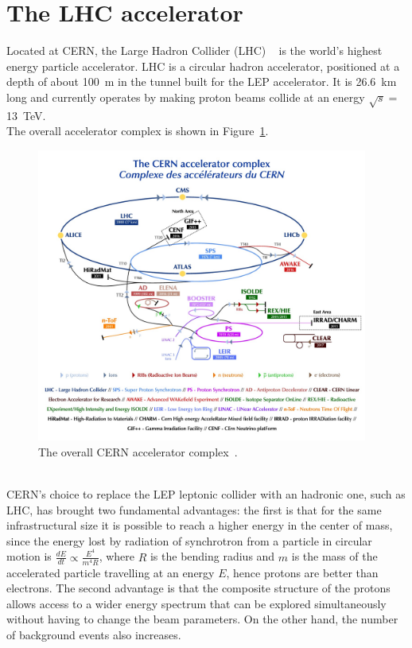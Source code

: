 \section{The LHC accelerator}
Located at CERN, the Large Hadron Collider (LHC) ~\cite{CERN_acc} is the world’s highest energy particle accelerator.
LHC is a circular hadron accelerator, positioned at a depth of about 100~m in the tunnel built for the LEP accelerator.
It is 26.6~km long and currently operates by making proton beams collide at an energy $ \sqrt {s} = $ 13~TeV. \\
The overall accelerator complex is shown in Figure~\ref{fig:CERN_complex}.
\begin{figure}[!h]
	\centering
	\includegraphics[width=0.97\textwidth]{Chapters/CH2/figures/CERN_complex}
	\caption{The overall CERN accelerator complex~\cite{CERN_complex}.}
	\label{fig:CERN_complex}
\end{figure}
\\CERN's choice to replace the LEP leptonic collider with an hadronic one, such as LHC, has brought two fundamental advantages: the first is that for the same infrastructural size it is possible to reach a higher energy in the center of mass, since the energy lost by radiation of synchrotron from a particle in circular motion is $\frac{dE}{dt}\propto\frac{E^4}{m^4R}$, where $R$ is the bending radius and $m$ is the mass of the accelerated particle travelling at an energy $E$, hence protons are better than electrons.
\newpage
\noindent The second advantage is that the composite structure of the protons allows access to a wider energy spectrum that can be explored simultaneously without having to change the beam parameters. On the other hand, the number of background events also increases.
